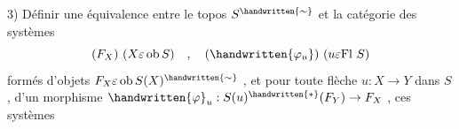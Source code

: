 3) Définir une équivalence entre le topos \(S^{\handwritten{\sim}}\) et la catégorie des systèmes
\[
(F_X)\ (X\varepsilon\operatorname{ob}S)\quad,\quad(\handwritten{\varphi_u})\ (u\varepsilon\mathrm{Fl}\ S)
\]
formés d'objets \(F_X\varepsilon\operatorname{ob}S(X)^{\handwritten{\sim}}\) , et pour toute flèche \(u:X\to Y\) dans \(S\) , d'un morphisme \(\handwritten{\varphi}_u:S(u)^{\handwritten{*}}(F_Y)\to F_X\) , ces systèmes

